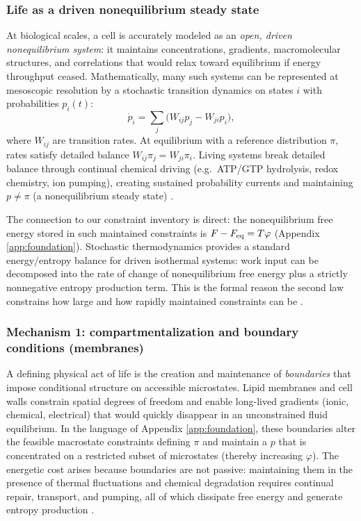 \documentclass[10pt]{article}
\begin{document}
\subsubsection{Life as a driven nonequilibrium steady state}
At biological scales, a cell is accurately modeled as an \emph{open, driven nonequilibrium system}:
it maintains concentrations, gradients, macromolecular structures, and correlations that would
relax toward equilibrium if energy throughput ceased. Mathematically, many such systems can be
represented at mesoscopic resolution by a stochastic transition dynamics on states \(i\) with
probabilities \(p_i(t)\):
\begin{equation}
\dot p_i = \sum_j \bigl(W_{ij} p_j - W_{ji} p_i\bigr),
\end{equation}
where \(W_{ij}\) are transition rates.
At equilibrium with a reference distribution \(\pi\), rates satisfy detailed balance
\(W_{ij}\pi_j = W_{ji}\pi_i\). Living systems break detailed balance through continual chemical
driving (e.g.\ ATP/GTP hydrolysis, redox chemistry, ion pumping), creating sustained probability
currents and maintaining \(p\neq \pi\) (a nonequilibrium steady state) \cite{Seifert2012ST,Schnakenberg1976}.

The connection to our constraint inventory is direct: the nonequilibrium free energy stored in such
maintained constraints is \(F-F_{\rm eq}=T\varphi\) (Appendix \ref{app:foundation}).
Stochastic thermodynamics provides a standard energy/entropy balance for driven isothermal systems:
work input can be decomposed into the rate of change of nonequilibrium free energy plus a strictly
nonnegative entropy production term. This is the formal reason the second law constrains how large
and how rapidly maintained constraints can be \cite{Seifert2012ST,Parrondo2015ThermoInfo}.

\subsubsection{Mechanism 1: compartmentalization and boundary conditions (membranes)}
A defining physical act of life is the creation and maintenance of \emph{boundaries} that impose
conditional structure on accessible microstates. Lipid membranes and cell walls constrain spatial
degrees of freedom and enable long-lived gradients (ionic, chemical, electrical) that would quickly
disappear in an unconstrained fluid equilibrium. In the language of Appendix \ref{app:foundation},
these boundaries alter the feasible macrostate constraints defining \(\pi\) and maintain a \(p\)
that is concentrated on a restricted subset of microstates (thereby increasing \(\varphi\)).
The energetic cost arises because boundaries are not passive: maintaining them in the presence of
thermal fluctuations and chemical degradation requires continual repair, transport, and pumping,
all of which dissipate free energy and generate entropy production \cite{Phillips2012PBoC,Mitchell1961Chemiosmotic}.
\end{document}
